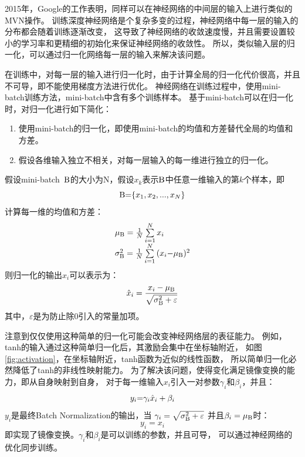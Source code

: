 2015年，Google的工作表明，同样可以在神经网络的中间层的输入上进行类似的MVN操作。
训练深度神经网络是个复杂多变的过程，神经网络中每一层的输入的分布都会随着训练逐渐改变，
这导致了神经网络的收敛速度慢，并且需要设置较小的学习率和更精细的初始化来保证神经网络的收敛性。
所以，类似输入层的归一化，可以通过归一化网络每一层的输入来解决该问题。

在训练中，对每一层的输入进行归一化时，由于计算全局的归一化代价很高，并且不可导，即不能使用梯度方法进行优化。
神经网络在训练过程中，使用mini-batch训练方法，mini-batch中含有多个训练样本。
基于mini-batch可以在归一化时，对归一化进行如下简化：
\begin{enumerate}
\item 使用mini-batch的归一化，即使用mini-batch的均值和方差替代全局的均值和方差。
\item 假设各维输入独立不相关，对每一层输入的每一维进行独立的归一化。
\end{enumerate}

假设mini-batch~${\rm B}$的大小为N，假设$x_k$表示${\rm B}$中任意一维输入的第$k$个样本，即
\begin{equation}
{\rm B}{\rm{ = }}\{ {x_1},{x_2},...,{x_N}\}
\end{equation}
计算每一维的均值和方差：
\begin{equation}
\begin{array}{l}
{\mu _{\rm B}} = \frac{1}{N}\sum\limits_{i = 1}^N {{x_i}} \\
\sigma _{\rm B}^2 = \frac{1}{N}\sum\limits_{i = 1}^N {({x_i} - } {\mu _{\rm B}}{)^2}
\end{array}
\end{equation}
则归一化的输出${\hat x}_i$可以表示为：
\begin{equation}
{{\hat x}_i} = \frac{{{x_i} - {\mu _{\rm B}}}}{{\sqrt {\sigma _{\rm B}^2 + \varepsilon } }}
\end{equation}
其中，$\varepsilon$是为防止除0引入的常量加项。

注意到仅仅使用这种简单的归一化可能会改变神经网络层的表征能力。
例如，tanh的输入通过这种简单归一化后，其激励会集中在坐标轴附近，
如图\ref{fig:activation}，在坐标轴附近，tanh函数为近似的线性函数，
所以简单归一化必然降低了tanh的非线性映射能力。
为了解决该问题，使得变化满足镜像变换的能力，即从自身映射到自身，
对于每一维输入$x_i$引入一对参数$\gamma _i$和$\beta _i$，并且：
\begin{equation}
{y_i}{\rm{ = }}{\gamma _i}{{\hat x}_i} + {\beta _i}
\end{equation}
$y_i$是最终Batch Normalization的输出，当
${\gamma _i} = \sqrt {\sigma _{\rm B}^2 + \varepsilon }$
并且${\beta _i} = {\mu _{\rm B}}$时：
\begin{equation}
{y_i} = {x_i}
\end{equation}
即实现了镜像变换。$\gamma _i$和$\beta _i$是可以训练的参数，并且可导，
可以通过神经网络的优化同步训练。

